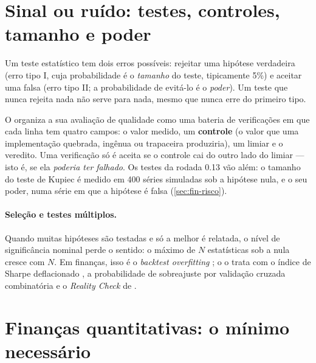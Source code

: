 \section{Sinal ou ruído: testes, controles, tamanho e poder}\label{sec:sinal}

\begin{graduacao}
Um teste estatístico tem dois erros possíveis: rejeitar uma hipótese verdadeira (erro tipo I, cuja probabilidade é o \emph{tamanho} do teste, tipicamente 5\%) e aceitar uma falsa (erro tipo II; a probabilidade de evitá-lo é o \emph{poder}). Um teste que nunca rejeita nada não serve para nada, mesmo que nunca erre do primeiro tipo.
\end{graduacao}

O \vapor{} organiza a sua avaliação de qualidade como uma bateria de verificações em que cada linha tem quatro campos: o valor medido, um \textbf{controle} (o valor que uma implementação quebrada, ingênua ou trapaceira produziria), um limiar e o veredito. Uma verificação só é aceita se o controle cai do outro lado do limiar --- isto é, se ela \emph{poderia ter falhado}. Os testes da rodada 0.13 vão além: o tamanho do teste de Kupiec é medido em 400 séries simuladas sob a hipótese nula, e o seu poder, numa série em que a hipótese é falsa (\autoref{sec:fin-risco}).

\paragraph{Seleção e testes múltiplos.} Quando muitas hipóteses são testadas e só a melhor é relatada, o nível de significância nominal perde o sentido: o máximo de $N$ estatísticas sob a nula cresce com $N$. Em finanças, isso é o \textit{backtest overfitting} \cite{bailey2014pbo,harvey2016}; o \vapor{} o trata com o índice de Sharpe deflacionado \cite{bailey2014dsr}, a probabilidade de sobreajuste por validação cruzada combinatória \cite{bailey2014pbo} e o \textit{Reality Check} de .

\section{Finanças quantitativas: o mínimo necessário}\label{sec:fin-fund}

